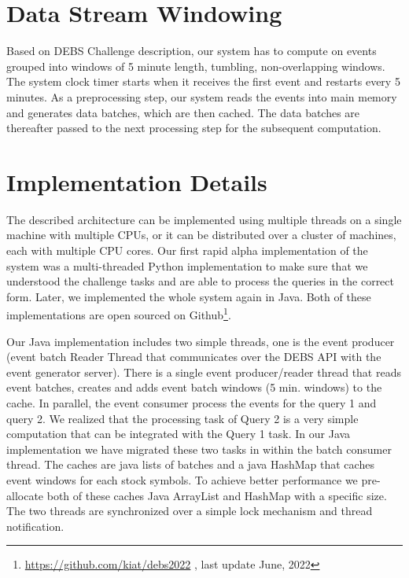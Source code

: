 \section{Data Stream Windowing}\label{sec:windows}
Based on DEBS Challenge \cite{debs2022challenge} description, our system has to compute on events grouped into windows of 5 minute length, tumbling,
non-overlapping windows. The system clock timer starts when it receives the first event and restarts every 5 minutes. As a preprocessing step, our system reads the events
into main memory and generates data batches, which are then cached. The data batches are thereafter passed to the next processing step for the subsequent computation.
    
    
\section{Implementation Details}\label{sec:implementation}
The described architecture can be implemented using multiple threads on a single machine with multiple CPUs, or it can be distributed over a cluster of machines, each with multiple CPU cores.
Our first rapid alpha implementation of the system was a multi-threaded Python implementation to make sure that we understood the challenge tasks and are able to process the queries in the correct form.
Later, we implemented the whole system again in Java. Both of these implementations are open sourced on Github\footnote{\url{https://github.com/kiat/debs2022} , last update June, 2022}.

Our Java implementation includes two simple threads, one is the event producer (event batch Reader Thread that communicates over the DEBS API with the event generator server). 
There is a single event producer/reader thread that reads event batches, creates and adds event batch windows (5 min. windows) to the cache. In parallel, the event consumer process the events for the 
query 1 and query 2. We realized that the processing task of Query 2 is a very simple computation that can be integrated with the Query 1 task. 
In our Java implementation we have migrated these two tasks in within the batch consumer thread. The caches are java lists of batches and a java HashMap that 
caches event windows for each stock symbols. To achieve better performance we pre-allocate both of these caches Java ArrayList and HashMap with a specific size. 
The two threads are synchronized over a simple lock mechanism and thread notification.    





